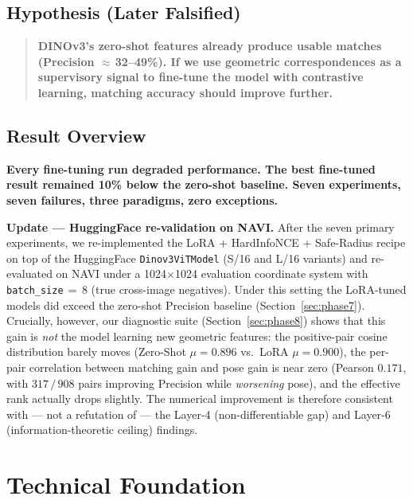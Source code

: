 \documentclass[11pt,a4paper]{article}
\begin{document}
\subsection{Hypothesis (Later Falsified)}

\begin{quote}
\bfseries DINOv3's zero-shot features already produce usable matches (Precision $\approx$\,32--49\%). If we use geometric correspondences as a supervisory signal to fine-tune the model with contrastive learning, matching accuracy should improve further.
\end{quote}

\subsection{Result Overview}

\begin{center}
\color{red!75!black}\bfseries
Every fine-tuning run degraded performance. The best fine-tuned result remained 10\% below the zero-shot baseline. Seven experiments, seven failures, three paradigms, zero exceptions.
\end{center}

\textbf{Update --- HuggingFace re-validation on NAVI.}
After the seven primary experiments, we re-implemented the LoRA + HardInfoNCE + Safe-Radius recipe on top of the HuggingFace \texttt{Dinov3ViTModel} (S/16 and L/16 variants) and re-evaluated on NAVI under a 1024$\times$1024 evaluation coordinate system with \texttt{batch\_size}\,$=$\,8 (true cross-image negatives). Under this setting the LoRA-tuned models did exceed the zero-shot Precision baseline (Section~\ref{sec:phase7}). Crucially, however, our diagnostic suite (Section~\ref{sec:phase8}) shows that this gain is \emph{not} the model learning new geometric features: the positive-pair cosine distribution barely moves (Zero-Shot $\mu=0.896$ vs.\ LoRA $\mu=0.900$), the per-pair correlation between matching gain and pose gain is near zero (Pearson $0.171$, with $317{\,/\,}908$ pairs improving Precision while \emph{worsening} pose), and the effective rank actually drops slightly. The numerical improvement is therefore consistent with --- not a refutation of --- the Layer-4 (non-differentiable gap) and Layer-6 (information-theoretic ceiling) findings.


\section{Technical Foundation}
\end{document}
